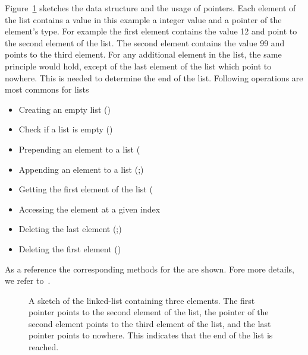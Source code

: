 \documentclass[11pt,fleqn]{book} %
\begin{document}
Figure~\ref{fig:sketch:linked:list} sketches the data structure and the usage of pointers. Each element of the list contains a value in this example a integer value and a pointer of the element's type. For example the first element contains the value 12 and point to the second element of the list. The second element contains the value 99 and points to the third element. For any additional element in the list, the same principle would hold, except of the last element of the list which point to nowhere. This is needed to determine the end of the list. Following operations are most commons for lists
\vspace{0.25cm}
\begin{itemize}
\item Creating an empty list ()
\item Check if a list is empty ()
\item Prepending an element to a list (
\item Appending an element to a list (;)
\item Getting the first element of the list (
\item Accessing the element at a given index 
\item Deleting the last element (;)
\item Deleting the first element ()
\end{itemize}
\vspace{0.25cm}
As a reference the corresponding methods for the  are shown. Fore more details, we refer to~\cite[Chapter 2]{knuth1997art}.

\begin{figure}[tbp]
\centering
{}
\caption{A sketch of the linked-list containing three elements. The first pointer points to the second element of the list, the pointer of the second element points to the third element of the list, and the last pointer points to nowhere. This indicates that the end of the list is reached.}
\label{fig:sketch:linked:list}
\end{figure}
\end{document}
